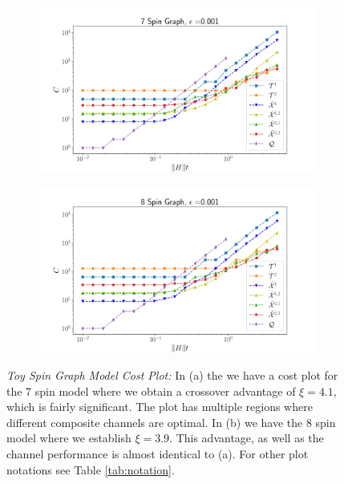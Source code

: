 \begin{figure}[htbp!]
\centering
    \begin{subfigure}[b]{.49\textwidth}
        \includegraphics[width=1\textwidth]{composite_numerics/graph7.png}
        \caption{} 
    \end{subfigure}
    \begin{subfigure}[b]{.49\textwidth}
        \includegraphics[width=1\textwidth]{composite_numerics/graph8.png}
        \caption{} 
    \end{subfigure}
    \caption{\textit{Toy Spin Graph Model Cost Plot:} In (a) the we have a cost plot for the 7 spin model where we obtain a crossover advantage of $\xi = 4.1$, which is fairly significant. The plot has multiple regions where different composite channels are optimal. In (b) we have the 8 spin model where we establish $\xi = 3.9$. This advantage, as well as the channel performance is almost identical to (a). For other plot notations see Table \ref{tab:notation}.}
    \label{fig:graph_sim}
\end{figure} 
\FloatBarrier

